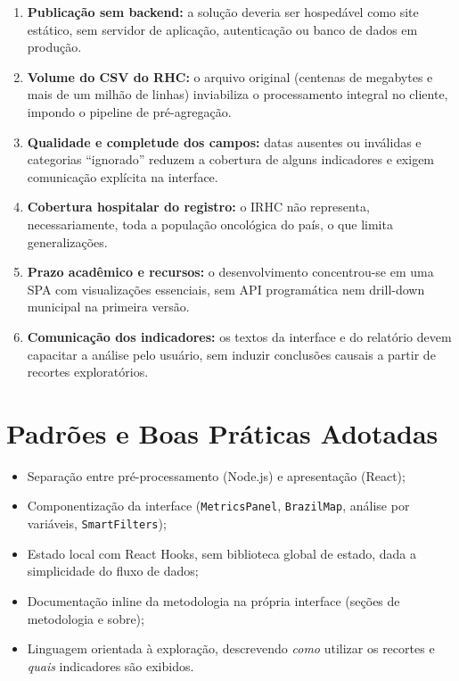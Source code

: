 \begin{enumerate}
	\item \textbf{Publicação sem backend:} a solução deveria ser hospedável como site estático, sem servidor de aplicação, autenticação ou banco de dados em produção.
	\item \textbf{Volume do \acs{CSV} do \acs{RHC}:} o arquivo original (centenas de megabytes e mais de um milhão de linhas) inviabiliza o processamento integral no cliente, impondo o pipeline de pré-agregação.
	\item \textbf{Qualidade e completude dos campos:} datas ausentes ou inválidas e categorias ``ignorado'' reduzem a cobertura de alguns indicadores e exigem comunicação explícita na interface.
	\item \textbf{Cobertura hospitalar do registro:} o \acs{IRHC} não representa, necessariamente, toda a população oncológica do país, o que limita generalizações.
	\item \textbf{Prazo acadêmico e recursos:} o desenvolvimento concentrou-se em uma \acs{SPA} com visualizações essenciais, sem API programática nem drill-down municipal na primeira versão.
	\item \textbf{Comunicação dos indicadores:} os textos da interface e do relatório devem capacitar a análise pelo usuário, sem induzir conclusões causais a partir de recortes exploratórios.
\end{enumerate}

\section{Padrões e Boas Práticas Adotadas}

\begin{itemize}
	\item Separação entre pré-processamento (Node.js) e apresentação (React);
	\item Componentização da interface (\texttt{MetricsPanel}, \texttt{BrazilMap}, análise por variáveis, \texttt{SmartFilters});
	\item Estado local com React Hooks, sem biblioteca global de estado, dada a simplicidade do fluxo de dados;
	\item Documentação inline da metodologia na própria interface (seções de metodologia e sobre);
	\item Linguagem orientada à exploração, descrevendo \textit{como} utilizar os recortes e \textit{quais} indicadores são exibidos.
\end{itemize}

